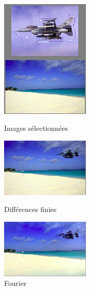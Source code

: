 \begin{figure}[!htb]
   \begin{minipage}{0.33\textwidth}
     \centering
     \includegraphics[width = 120pt]{Images/Resultats/avionPlage.png}
     \caption{Images sélectionnées}
      \end{minipage}\hfill
   \begin{minipage}{0.33\textwidth}
     \centering
     \includegraphics[width = 120pt]{Images/Resultats/avion1.png}
     \caption{Différences finies}
      \end{minipage}\hfill
   \begin{minipage}{0.33\textwidth}
     \centering
     \includegraphics[width= 120pt]{Images/Resultats/avionF.png}
     \caption{Fourier}
   \end{minipage}
\end{figure}
\newpage